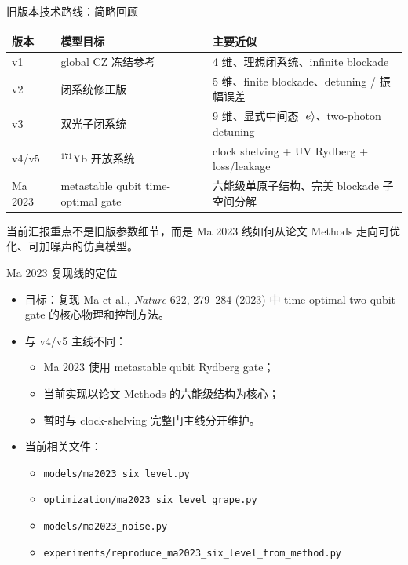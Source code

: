 \documentclass[aspectratio=169,11pt]{ctexbeamer}
\begin{document}
\begin{frame}{旧版本技术路线：简略回顾}
  \begin{table}
    \centering
    \small
    \begin{tabular}{lll}
      \toprule
      版本 & 模型目标 & 主要近似 \\
      \midrule
      v1 & global CZ 冻结参考 & 4 维、理想闭系统、infinite blockade \\
      v2 & 闭系统修正版 & 5 维、finite blockade、detuning / 振幅误差 \\
      v3 & 双光子闭系统 & 9 维、显式中间态 \(\ket{e}\)、two-photon detuning \\
      v4/v5 & \({}^{171}\mathrm{Yb}\) 开放系统 & clock shelving + UV Rydberg + loss/leakage \\
      Ma 2023 & metastable qubit time-optimal gate & 六能级单原子结构、完美 blockade 子空间分解 \\
      \bottomrule
    \end{tabular}
  \end{table}

  \vspace{0.5em}
  当前汇报重点不是旧版参数细节，而是 Ma 2023 线如何从论文 Methods 走向可优化、可加噪声的仿真模型。
\end{frame}

\begin{frame}{Ma 2023 复现线的定位}
  \begin{itemize}
    \item 目标：复现 Ma et al., \emph{Nature} 622, 279--284 (2023) 中 time-optimal two-qubit gate 的核心物理和控制方法。
    \item 与 v4/v5 主线不同：
      \begin{itemize}
        \item Ma 2023 使用 metastable qubit Rydberg gate；
        \item 当前实现以论文 Methods 的六能级结构为核心；
        \item 暂时与 clock-shelving 完整门主线分开维护。
      \end{itemize}
    \item 当前相关文件：
      \begin{itemize}
        \item \texttt{models/ma2023\_six\_level.py}
        \item \texttt{optimization/ma2023\_six\_level\_grape.py}
        \item \texttt{models/ma2023\_noise.py}
        \item \texttt{experiments/reproduce\_ma2023\_six\_level\_from\_method.py}
      \end{itemize}
  \end{itemize}
\end{frame}
\end{document}
